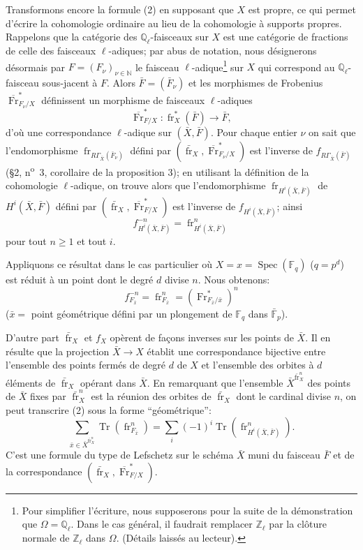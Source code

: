 \documentclass[11pt]{article}
\DeclareMathOperator{\Spec}{Spec}
\providecommand{\Tr}{\operatorname{Tr}}
\providecommand{\Tr}{\operatorname{Tr}}
\providecommand{\Tr}{\operatorname{Tr}}
\providecommand{\Tr}{\operatorname{Tr}}
\providecommand{\Spec}{\operatorname{Spec}}
\providecommand{\Spec}{\operatorname{Spec}}
\providecommand{\Spec}{\operatorname{Spec}}
\providecommand{\Tr}{\operatorname{Tr}}
\providecommand{\fr}{\operatorname{fr}}
\providecommand{\Fr}{\operatorname{Fr}}
\providecommand{\Fr}{\operatorname{Fr}}
\providecommand{\fr}{\operatorname{fr}}
\providecommand{\Spec}{\operatorname{Spec}}
\begin{document}
Transformons encore la formule (2) en supposant que $X$ est propre, ce qui permet d'écrire la cohomologie ordinaire au lieu de la cohomologie à supports propres. Rappelons que la catégorie des $\mathbb Q_\ell$-faisceaux sur $X$ est une catégorie de fractions de celle des faisceaux $\ell$-adiques; par abus de notation, nous désignerons désormais par $F=(F_\nu)_{\nu\in\mathbb N}$ le faisceau $\ell$-adique\footnote{Pour simplifier l'écriture, nous supposerons pour la suite de la démonstration que $\Omega=\mathbb Q_\ell$. Dans le cas général, il faudrait remplacer $\mathbb Z_\ell$ par la clôture normale de $\mathbb Z_\ell$ dans $\Omega$. (Détails laissés au lecteur).} sur $X$ qui correspond au $\mathbb Q_\ell$-faisceau sous-jacent à $F$. Alors $\bar F=(\bar F_\nu)$ et les morphismes de Frobenius $\overline{\Fr}^*_{F_\nu/X}$ définissent un morphisme de faisceaux $\ell$-adiques
\[
\overline{\Fr}^*_{F/X}:\fr_X^*(\bar F)\longrightarrow\bar F,
\]
d'où une correspondance $\ell$-adique sur $(\bar X,\bar F)$. Pour chaque entier $\nu$ on sait que l'endomorphisme $\fr_{R\Gamma_{\bar X}(\bar F_\nu)}$ défini par $(\bar{\fr}_X,\overline{\Fr}^*_{F_\nu/X})$ est l'inverse de $f_{R\Gamma_{\bar X}(\bar F)}$ (§2, n\textsuperscript{o}~3, corollaire de la proposition 3); en utilisant la définition de la cohomologie $\ell$-adique, on trouve alors que l'endomorphisme $\fr_{H^i(\bar X,\bar F)}$ de $H^i(\bar X,\bar F)$ défini par $(\bar{\fr}_X,\overline{\Fr}^*_{F/X})$ est l'inverse de $f_{H^i(\bar X,\bar F)}$; ainsi
\[
f^{-n}_{H^i(\bar X,\bar F)}=\fr^n_{H^i(\bar X,\bar F)}
\]
pour tout $n\ge1$ et tout $i$.

Appliquons ce résultat dans le cas particulier où $X=x=\Spec(\mathbb F_q)$ ($q=p^d$) est réduit à un point dont le degré $d$ divise $n$. Nous obtenons:
\[
f^{-n}_{F_{\bar x}}=\fr^n_{F_{\bar x}}=(\Fr^*_{F_{\bar x}/\bar x})^n
\]
($\bar x=$ point géométrique défini par un plongement de $\mathbb F_q$ dans $\bar{\mathbb F}_p$).

D'autre part $\bar{\fr}_X$ et $f_X$ opèrent de façons inverses sur les points de $\bar X$. Il en résulte que la projection $\bar X\to X$ établit une correspondance bijective entre l'ensemble des points fermés de degré $d$ de $X$ et l'ensemble des orbites à $d$ éléments de $\bar{\fr}_X$ opérant dans $\bar X$. En remarquant que l'ensemble $\bar X^{\bar{\fr}_X^n}$ des points de $\bar X$ fixes par $\bar{\fr}_X^n$ est la réunion des orbites de $\bar{\fr}_X$ dont le cardinal divise $n$, on peut transcrire (2) sous la forme ``géométrique'':
\[
\sum_{\bar x\in\bar X^{\bar{\fr}_X^n}}\Tr(\fr^n_{F_{\bar x}})
=\sum_i(-1)^i\Tr(\fr^n_{H^i(\bar X,\bar F)}).
\tag{2'}
\]
C'est une formule du type de Lefschetz sur le schéma $\bar X$ muni du faisceau $\bar F$ et de la correspondance $(\bar{\fr}_X,\overline{\Fr}^*_{F/X})$.
\end{document}
